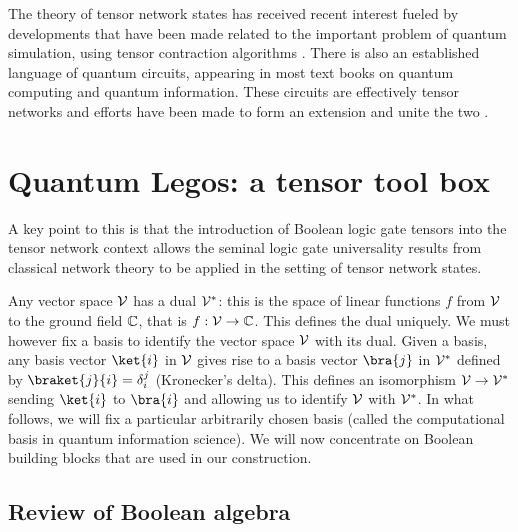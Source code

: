  \begin{remark}
  The theory of tensor network states has received recent interest fueled by developments that have been made related to 
  the important problem of quantum simulation, using tensor contraction algorithms \cite{MPSreview08,TNSreview09}. There is also an established language of quantum circuits, appearing in most text books on quantum computing and quantum information.  These circuits 
  are effectively tensor networks and efforts have been made to form an extension and unite the two \cite{BB11}.  
 \end{remark}


\section{Quantum Legos: a tensor tool box}\label{sec:components}
A key point to this is that the introduction of Boolean logic gate tensors
into the tensor network context allows the seminal logic gate universality results from classical network
theory to be applied in the setting of tensor network states. 

\begin{remark}
Any vector space ${\cal V}$ has a dual ${\cal V}^*$: this is the space of linear functions $f$
from ${\cal V}$ to the ground field ${\mathbb C}$, that is $f: {\cal V} \rightarrow {\mathbb C}$. This defines
the dual uniquely.  We must however fix a basis to identify the vector
space ${\cal V}$ with its dual.  Given a basis, any basis vector $\ket{i}$ in ${\cal V}$ gives
rise to a basis vector $\bra{j}$ in ${\cal V}^*$ defined by $\braket{j}{i} = \delta^j_i$ (Kronecker's delta). 
This defines an isomorphism ${\cal V}\rightarrow {\cal V}^*$ sending $\ket{i}$ to $\bra{i}$ and
allowing us to identify ${\cal V}$ with ${\cal V}^*$.  In what follows, we will fix a particular
arbitrarily chosen basis (called the computational basis in quantum information
science).  We will now concentrate on Boolean building blocks that are used
in our construction.  
\end{remark}



\subsection*{Review of Boolean algebra}

